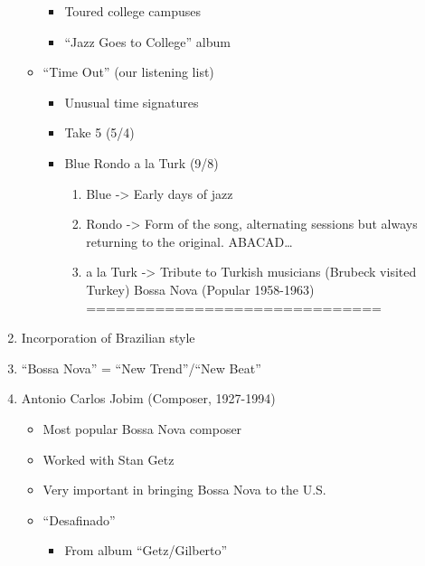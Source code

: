 \documentclass[]{article}
\providecommand{\tightlist}{%
  \setlength{\itemsep}{0pt}\setlength{\parskip}{0pt}}
\begin{document}
\begin{enumerate}
\begin{itemize}
    \begin{itemize}
    \tightlist
    \item
      Toured college campuses
    \item
      ``Jazz Goes to College'' album
    \end{itemize}
  \item
    ``Time Out'' (our listening list)

    \begin{itemize}
    \tightlist
    \item
      Unusual time signatures
    \item
      Take 5 (5/4)
    \item
      Blue Rondo a la Turk (9/8)

      \begin{enumerate}
      \def\labelenumii{\roman{enumii}.}
      \tightlist
      \item
        Blue -\textgreater{} Early days of jazz
      \item
        Rondo -\textgreater{} Form of the song, alternating sessions but
        always returning to the original. ABACAD\ldots{}
      \item
        a la Turk -\textgreater{} Tribute to Turkish musicians (Brubeck
        visited Turkey) Bossa Nova (Popular 1958-1963)
        ==============================
      \end{enumerate}
    \end{itemize}
  \end{itemize}
\item
  Incorporation of Brazilian style
\item
  ``Bossa Nova'' = ``New Trend''/``New Beat''
\item
  Antonio Carlos Jobim (Composer, 1927-1994)

  \begin{itemize}
  \tightlist
  \item
    Most popular Bossa Nova composer
  \item
    Worked with Stan Getz
  \item
    Very important in bringing Bossa Nova to the U.S.
  \item
    ``Desafinado''

    \begin{itemize}
    \tightlist
    \item
      From album ``Getz/Gilberto''
    \end{itemize}
  \end{itemize}
\end{enumerate}
\end{document}
